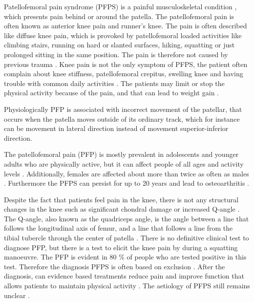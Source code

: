 Patellofemoral pain syndrome (PFPS) is a painful musculoskeletal condition \citep{Maclachlan2017, Smith2015}, which presents pain behind or around the patella. The patellofemoral pain is often known as anterior knee pain and runner’s knee. The pain is often described like diffuse knee pain, which is provoked by patellofemoral loaded activities like climbing stairs, running on hard or slanted surfaces, hiking, squatting or just prolonged sitting in the same position.\citep{Crossley2016, Crossley2015, Smith2015, Boudreau2017} The pain is therefore not caused by previous trauma \citep{Crossley2016}.
Knee pain is not the only symptom of PFPS, the patient often complain about knee stiffness, patellofemoral crepitus, swelling knee and having trouble with common daily activities \citep{Martini2012, Crossley2016}. The patients may limit or stop the physical activity because of the pain, and that can lead to weight gain \citep{Petersen2013, Crossley2016}.

Physiologically PFP is associated with incorrect movement of the patellar, that occurs when the patella moves outside of its ordinary track, which for instance can be movement in lateral direction instead of movement superior-inferior direction.\citep{Martini2012}

The patellofemoral pain (PFP) is mostly prevalent in adolescents and younger adults who are physically active, but it can affect people of all ages and activity levels \citep{Crossley2016, Maclachlan2017, Crossley2015}. Additionally,  females are affected about more than twice as often as males \citep{Petersen2013}. Furthermore the PFPS can persist for up to 20 years and lead to osteoarthritis \citep{Petersen2013, Crossley2016}.

Despite the fact that patients feel pain in the knee, there is not any structural changes in the knee such as significant chondral damage or increased Q-angle \citep{Petersen2013}. The Q-angle, also known as the quadriceps angle, is the angle between a line that follows the longitudinal axis of femur, and a line that follows a line from the tibial tubercle through the center of patella \citep{Dahab2011}.
There is no definitive clinical test to diagnose PFP, but there is a test to elicit the knee pain by during a squatting manoeuvre. The PFP is evident in 80 \% of people who are tested positive in this test.\citep{Crossley2016, Crossley2015} Therefore the diagnosis PFPS is often based on exclusion \citep{Petersen2013}. After the diagnosis, can evidence based treatments reduce pain and improve function that allows patients to maintain physical activity \citep{Crossley2015}.
The aetiology of PFPS still remains unclear \citep{Smith2015}.

